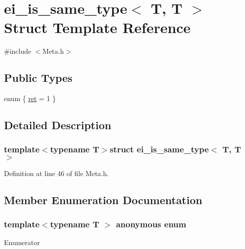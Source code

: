\hypertarget{structei__is__same__type_3_01_t_00_01_t_01_4}{\section{ei\-\_\-is\-\_\-same\-\_\-type$<$ T, T $>$ Struct Template Reference}
\label{structei__is__same__type_3_01_t_00_01_t_01_4}
}


{\ttfamily \#include $<$Meta.\-h$>$}

\subsection*{Public Types}
\begin{DoxyCompactItemize}
\item 
enum \{ \hyperlink{structei__is__same__type_3_01_t_00_01_t_01_4_a56f3a3ac7f296500729145018cb553d4a2f2c60f47790abdc26dfc1dfa22a46e3}{ret} = 1
 \}
\end{DoxyCompactItemize}


\subsection{Detailed Description}
\subsubsection*{template$<$typename T$>$struct ei\-\_\-is\-\_\-same\-\_\-type$<$ T, T $>$}



Definition at line 46 of file Meta.\-h.



\subsection{Member Enumeration Documentation}
\hypertarget{structei__is__same__type_3_01_t_00_01_t_01_4_a56f3a3ac7f296500729145018cb553d4}{\subsubsection[{anonymous enum}]{\setlength{\rightskip}{0pt plus 5cm}template$<$typename T $>$ anonymous enum}}\label{structei__is__same__type_3_01_t_00_01_t_01_4_a56f3a3ac7f296500729145018cb553d4}
\begin{Desc}
\item[Enumerator]\par
\begin{description}
\item[{\em 
\hypertarget{structei__is__same__type_3_01_t_00_01_t_01_4_a56f3a3ac7f296500729145018cb553d4a2f2c60f47790abdc26dfc1dfa22a46e3}{ret}\label{structei__is__same__type_3_01_t_00_01_t_01_4_a56f3a3ac7f296500729145018cb553d4a2f2c60f47790abdc26dfc1dfa22a46e3}
}]\end{description}
\end{Desc}


